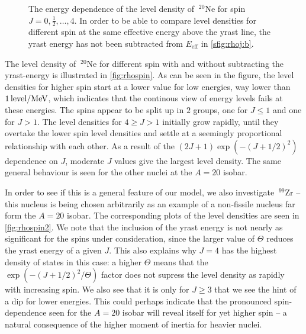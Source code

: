 \begin{figure}
\begin{center}
\begin{tabular}{cc}
\end{tabular}
\caption{\label{fig:rhospin} The energy dependence of the level density of $~^{20}\mathrm{Ne}$ for spin $J=0,\tfrac{1}{2},\dots, 4$. In order to be able to compare level densities for different spin at the same effective energy above the yrast line, the yrast energy has not been subtracted from $E_\text{eff}$ in \ref{sfig:rhoj:b}.}
\end{center}
\end{figure}

The level density of $~^{20}\mathrm{Ne}$ for different spin with and without subtracting the yrast-energy is illustrated in \autoref{fig:rhospin}. 
As can be seen in the figure, the level densities for higher spin start at a lower value for low energies, way lower than $\unit[1]{level/MeV}$, which indicates that the continous view of energy levels fails at these energies. 
The spins appear to be split up in $2$ groups, one for $J \le 1$ and one for $J>1$.
The level densities for $4 \ge J> 1$ initially grow rapidly, until they overtake the lower spin level densities and settle at a seemingly proportional relationship with each other. As a result of the $(2J+1)\exp{(-(J+1/2)^2)}$ dependence on $J$, moderate $J$ values give the largest level density.
The same general behaviour is seen for the other nuclei at the $A=20$ isobar.

In order to see if this is a general feature of our model, we also investigate $~^{99}\mathrm{Zr}$ -- this nucleus is being chosen arbitrarily as an example of a non-fissile nucleus far form the $A=20$ isobar. The corresponding plots of the level densities are seen in \autoref{fig:rhospin2}. We note that the inclusion of the yrast energy is not nearly as significant for the spins under consideration, since the larger value of $\Theta$ reduces the yrast energy of a given $J$. This also explains why $J=4$ has the highest density of states in this case: a higher $\Theta$ means that the $\exp{(-(J+1/2)^2/\Theta)}$ factor does not supress the level density as rapidly with increasing spin. 
We also see that it is only for $J\ge 3$ that we see the hint of a dip for lower energies. This could perhaps indicate that the pronounced spin-dependence seen for the $A=20$ isobar will reveal itself for yet higher spin -- a natural consequence of the higher moment of inertia for heavier nuclei.

